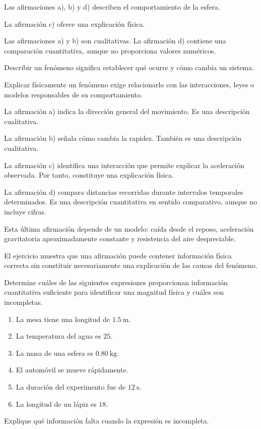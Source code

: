 \begin{respuesta}
Las afirmaciones a), b) y d) describen el comportamiento de la esfera.

La afirmación c) ofrece una explicación física.

Las afirmaciones a) y b) son cualitativas. La afirmación d) contiene una comparación cuantitativa, aunque no proporciona valores numéricos.
\end{respuesta}

\begin{explicacion}
Describir un fenómeno significa establecer qué ocurre y cómo cambia un sistema.

Explicar físicamente un fenómeno exige relacionarlo con las interacciones, leyes o modelos responsables de su comportamiento.

La afirmación a) indica la dirección general del movimiento. Es una descripción cualitativa.

La afirmación b) señala cómo cambia la rapidez. También es una descripción cualitativa.

La afirmación c) identifica una interacción que permite explicar la aceleración observada. Por tanto, constituye una explicación física.

La afirmación d) compara distancias recorridas durante intervalos temporales determinados. Es una descripción cuantitativa en sentido comparativo, aunque no incluye cifras.

Esta última afirmación depende de un modelo: caída desde el reposo, aceleración gravitatoria aproximadamente constante y resistencia del aire despreciable.

El ejercicio muestra que una afirmación puede contener información física correcta sin constituir necesariamente una explicación de las causas del fenómeno.
\end{explicacion}


\begin{ejercicio}
Determine cuáles de las siguientes expresiones proporcionan información cuantitativa suficiente para identificar una magnitud física y cuáles son incompletas.

\begin{enumerate}[label=\alph*)]
    \item La mesa tiene una longitud de \(\SI{1.5}{\meter}\).
    \item La temperatura del agua es \(25\).
    \item La masa de una esfera es \(\SI{0.80}{\kilogram}\).
    \item El automóvil se mueve rápidamente.
    \item La duración del experimento fue de \(\SI{12}{\second}\).
    \item La longitud de un lápiz es \(18\).
\end{enumerate}

Explique qué información falta cuando la expresión es incompleta.
\end{ejercicio}

